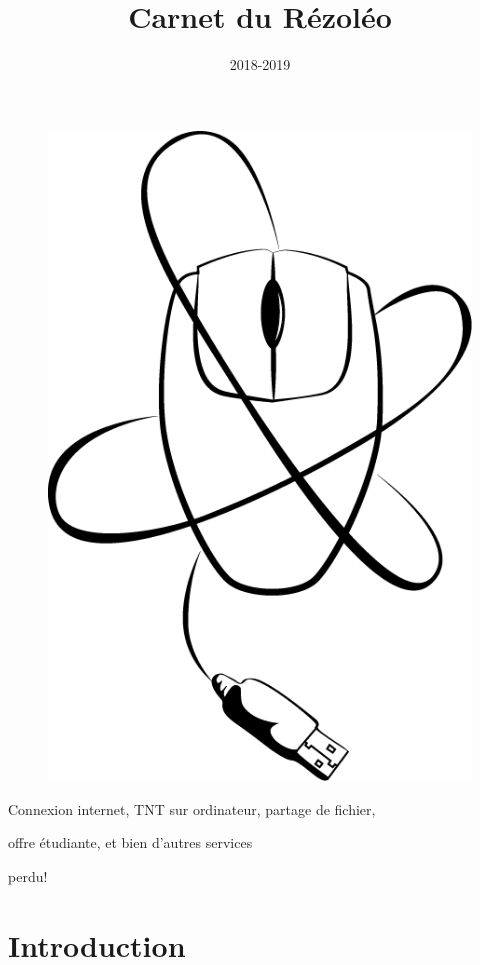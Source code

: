 \documentclass[12pt]{article}
\begin{document}
\title{Carnet du Rézoléo}
\author{}
\date{2018-2019}
\maketitle
\vspace*{1cm}
\begin{figure}[h!]
\centerline{\includegraphics[scale=0.35]{rezoleo.png}}
\end{figure}
\vspace*{1cm}

\centerline{Connexion internet, TNT sur ordinateur, partage de fichier,}
\centerline{offre étudiante, et bien d'autres services}

\newpage
\color{white}
perdu!
\newpage
\color{black}
\section{Introduction}
\end{document}

